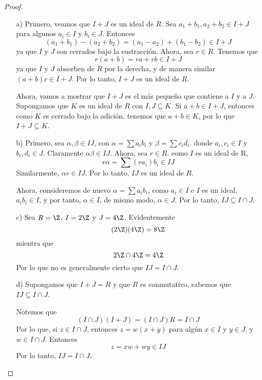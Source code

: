 \begin{problem}[34]
\end{problem}

\begin{proof} \, 
    \begin{enumerate}
        \item[a)] Primero, veamos que $I+J$ es un ideal de $R$. Sea $a_1 + b_1, a_2 + b_2 \in I + J$ para algunos $a_i \in I$ y $b_i \in J$. Entonces
        $$ (a_1+b_1)-(a_2+b_2) = (a_1-a_2) + (b_1-b_2) \in I +J $$
        ya que $I$ y $J$ son cerrados bajo la sustracción. Ahora, sea $r \in R$. Tenemos que 
        $$ r(a+b) = ra + rb \in I + J$$
        ya que $I$ y $J$ absorben de $R$ por la derecha, y de manera similar $(a+b)r \in I+J$. Por lo tanto, $I+J$ es un ideal de $R$.

        Ahora, vamos a mostrar que $I+J$ es el más pequeño que contiene a $I$ y a $J$. Supongamos que $K$ es un ideal de $R$ con $I,J \subseteq K$. Si $a+b \in I+J$, entonces como $K$ es cerrado bajo la adición, tenemos que $a+b \in K$, por lo que $I+J \subseteq K$.

        \item[b)] Primero, sea $\alpha, \beta \in IJ$, con $\alpha = \sum a_i b_i$ y $\beta = \sum c_i d_i$. donde $a_i, c_i \in I$ y $b_i, d_i \in J$. Claramente $\alpha\beta \in IJ$. Ahora, sea $r \in R$. como $I$ es un ideal de R,
        $$ r\alpha = \sum (r a_i) b_i \in IJ$$
        Similarmente, $\alpha r \in IJ$. Por lo tanto, $IJ$ es un ideal de $R$.

        Ahora, consideremos de nuevo $\alpha = \sum a_i b_i$, como $a_i \in I$ e $I$ es un ideal, $a_i b_i \in I$, y por tanto, $\alpha \in I$, de mismo modo, $\alpha \in J$. Por lo tanto, $IJ \subseteq I \cap J$.

        \item[c)] Sea $R = \Z$, $I = 2\Z$ y $J = 4\Z$. Evidentemente
        $$ (2\Z)(4\Z) = 8\Z$$
        mientra que
        $$ 2\Z \cap 4\Z = 4\Z$$
        Por lo que no es generalmente cierto que $IJ = I \cap J$.

        \item[d)] Supongamos que $I+J = R$ y que $R$ es conmutativo, sabemos que $IJ \subseteq I \cap J$.
        
        Notemos que 
        $$ (I \cap J)(I+J) = (I \cap J)R = I \cap J $$
        Por lo que, si $z \in I \cap J$, entonces $z = w(x+y)$ para algún $x \in I$ y $y \in J$. y $w \in I \cap J$. Entonces
        $$ z = xw + wy \in IJ $$
        Por lo tanto, $IJ = I \cap J$.
    \end{enumerate}
\end{proof}